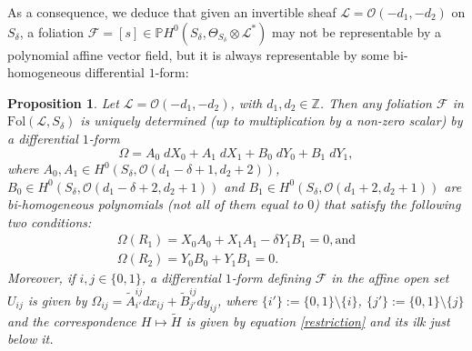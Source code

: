 \documentclass{amsart} %
\newtheorem{proposition}[theorem]{Proposition}
\theoremstyle{definition}
\newcommand{\cts}{\Theta_{S_{\delta}}}
\newcommand{\cs}{S_{\delta}}
\newcommand{\PP}{\mathbb{P}}
\newcommand{\mcL}{\mathcal{L}}
\newcommand{\mcO}{\mathcal{O}}
\newcommand{\mcF}{\mathcal{F}}
\begin{document}

As a consequence, we deduce that given an invertible sheaf $\mcL=\mcO(-d_1,-d_2)$ on $ \cs $,
a foliation
$ \mcF = [s] \in \PP H^{0}( S_{\delta}, \cts \otimes \mcL^{*}) $ may not be representable
by a polynomial affine vector field, but it is always representable by some
bi-homogeneous differential $1$-form:
\begin{proposition}\label{forms}
Let $\mcL=\mcO(-d_1,-d_2)$, with $d_1,d_2\in \mathbb{Z}$. Then any foliation
$\mathcal F$ in $\mathrm{Fol}(\mcL,S_{\delta})$ is uniquely determined (up to multiplication by
a non-zero scalar) by a differential $1$-form
 \begin{equation}\label{1-form}
\Omega=A_0\;dX_0+A_1\; dX_1+B_0\; dY_0+ B_1\;dY_1,
 \end{equation}
 where
 $ A_0,A_1 \in H^0( S_{\delta}, \mcO(d_1-\delta+1,d_2+2) ) $,
 $ B_0 \in H^0( S_{\delta}, \mcO(d_1-\delta+2,d_2+1) ) $ and
 $ B_1 \in H^0( S_{\delta}, \mcO(d_1+2,d_2+1) ) $
 are bi-homogeneous polynomials (not all of them equal to $0$)
that satisfy the following two conditions:
\begin{equation}\label{condit1}
   \begin{gathered}
  \Omega( R_1 ) = X_0A_0 +X_1A_1-\delta Y_1B_1 = 0, \mbox{and}  \\
  \Omega( R_2 ) = Y_0B_0+Y_1B_1 = 0.
   \end{gathered}
\end{equation}
Moreover, if $i,j\in \{0,1\}$, a differential $1$-form defining $\mathcal F$ in the affine open set $U_{ij}$
is given by
$ \Omega_{ij} = \tilde{A}_{i'}^{ij}dx_{ij}+\tilde{B}_{j'}^{ij}dy_{ij}$, where $\{i'\}:=\{0,1\}\setminus \{i\}$,
$\{j'\}:=\{0,1\}\setminus \{j\}$ and the correspondence $ H \mapsto \tilde{H} $ is given by
equation \eqref{restriction} and its ilk just below it.
\end{proposition}
\end{document}
